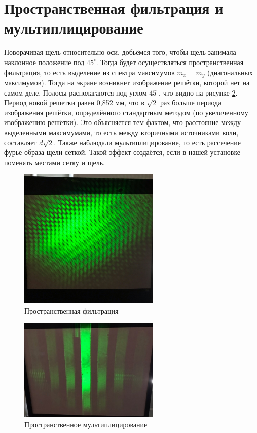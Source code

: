 \documentclass[12pt]{article}
\begin{document}
\section{Пространственная фильтрация и мультиплицирование}

Поворачивая щель относительно оси, добьёмся того, чтобы щель занимала наклонное положение под $45^\circ$. Тогда будет осуществляться пространственная фильтрация, то есть выделение из спектра максимумов $m_x = m_y$ (диагональных максимумов). Тогда на экране возникнет изображение решётки, которой нет на самом деле. Полосы располагаются под углом $45^\circ$, что видно на рисунке \ref{filtr}. Период новой решетки равен 0,852 мм, что в $\sqrt{2}$ раз больше периода изображения решётки, определённого стандартным методом (по увеличенному изображению решётки). Это объясняется тем фактом, что расстояние между выделенными максимумами, то есть между вторичными источниками волн, составляет $d\sqrt{2}$. Также наблюдали мультиплицирование, то есть рассечение фурье-образа щели сеткой. Такой эффект создаётся, если в нашей установке поменять местами сетку и щель.

\begin{figure}[h]
    \centering
    \includegraphics[width= 0.6\textwidth]{5.jpg}
    \caption{Пространственная фильтрация}
    \label{filtr}
\end{figure}


\begin{figure}[h]
    \centering
    \includegraphics[width=0.6\textwidth]{6.jpg}
    \caption{Пространственное мультиплицирование}
    \label{filtr}
\end{figure}
\end{document}
